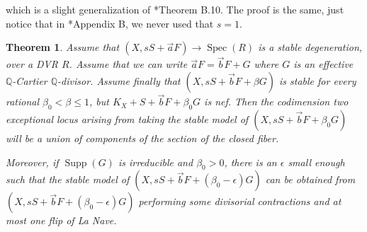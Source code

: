 \documentclass[11pt]{amsart}
\newcommand{\spec}{\operatorname{Spec}}
\newcommand{\supp}{\operatorname{Supp}}
\newtheorem{Teo}[theorem]{Theorem}
\theoremstyle{definition}
\begin{document}
which
is a slight generalization of \cite{AB3}*{Theorem B.10}. The proof is the same, just notice that in \cite{AB3}*{Appendix B},
we never used that $s=1$.
\begin{Teo}\label{Teo:generalization:of:appendix}
   Assume that $(X,sS+\vec{a}F) \to \spec(R)$ is a stable degeneration, over a DVR $R$. Assume that
 we can write $\vec{a}F=\vec{b}F+G$ where $G$ is an effective $\mathbb{Q}$-Cartier $\mathbb{Q}$-divisor.
 Assume finally that $(X,sS+\vec{b}F+\beta G)$ is stable for every rational $\beta_0 < \beta \le 1$, but $K_X+S+\vec{b}F+\beta_0G$ is nef.
  Then the codimension two exceptional locus arising from taking the stable model of $(X, sS + \vec{b}F+\beta_0 G)$ will be a union of components of
  the section of the closed fiber.
  
  Moreover, if $\supp(G)$ is irreducible and $\beta_0>0$, there is an $\epsilon$ small enough such that the stable model of $(X,sS+\vec{b}F+
  (\beta_0-\epsilon)G)$ can be obtained from $(X,sS+\vec{b}F+
  (\beta_0-\epsilon)G)$ performing some divisorial contractions and at most one flip of La Nave.
\end{Teo}
\end{document}
